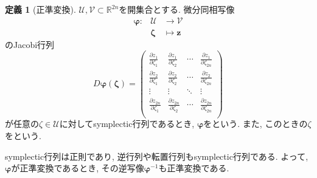 \documentclass{ltjsarticle}
\theoremstyle{definition}
\numberwithin{thm}{section}
\theoremstyle{definition}
\numberwithin{prop}{section}
\theoremstyle{definition}
\newtheorem{dfn}{定義}
\numberwithin{dfn}{section}
\numberwithin{equation}{section}
\begin{document}
\begin{dfn}[正準変換]
    $\mathcal{U},\mathcal{V}\subset \mathbb{R}^{2n}$を開集合とする. 微分同相写像
    \begin{equation}
    \begin{aligned}
        \bm{\varphi}:&\mathcal{U}&\to \mathcal{V} \\
        &\bm{\zeta}&\mapsto \bm{z}
    \end{aligned}
    \end{equation}
    のJacobi行列
    \begin{equation*}
        D\bm{\varphi}(\bm{\zeta})=\begin{pmatrix}
            \frac{\partial z_1}{\partial \zeta_1}&\frac{\partial z_1}{\partial \zeta_2}&\cdots&\frac{\partial z_1}{\partial \zeta_{2n}} \\
            \frac{\partial z_2}{\partial \zeta_1}&\frac{\partial z_2}{\partial \zeta_2}&\cdots&\frac{\partial z_2}{\partial \zeta_{2n}} \\
            \vdots&\vdots&\ddots&\vdots \\
            \frac{\partial z_{2n}}{\partial \zeta_1}&\frac{\partial z_{2n}}{\partial \zeta_2}&\cdots&\frac{\partial z_{2n}}{\partial \zeta_{2n}} \\
        \end{pmatrix}
    \end{equation*}
    が任意の$\zeta \in \mathcal{U}$に対してsymplectic行列であるとき, $\bm{\varphi}$をという. また, このときの$\zeta$をという.
\end{dfn}
symplectic行列は正則であり, 逆行列や転置行列もsymplectic行列である. よって, $\bm{\varphi}$が正準変換であるとき, その逆写像$\bm{\varphi}^{-1}$も正準変換である.
\end{document}
